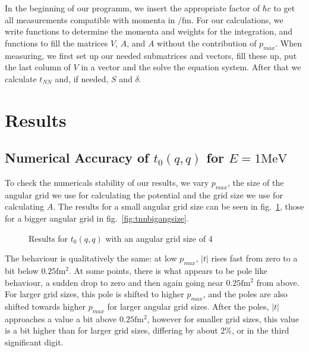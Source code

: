 \documentclass{scrartcl}
\begin{document}
In the beginning of our programm, we insert the appropriate factor of $\hbar c$ to get all measurements compatible with momenta in $\si{\per\femto\meter}$.
For our calculations, we write functions to determine the momenta and weights for the integration, and functions to fill the matrices $V$, $A$, and $A$ without the contribution of $p_{max}$. When measuring, we first set up our needed submatrices and vectors, fill these up, put the last column of $V$ in a vector and the solve the equation system. After that we calculate $t_{NN}$ and, if needed, $S$ and $\delta$.


\section{Results}
\subsection{Numerical Accuracy of $t_0(q,q)$ for $E=1\si{\mega\electronvolt}$}

To check the numericals stability of our results, we vary $p_{max}$, the size of the angular grid we use for calculating the potential and the grid size we use for calculating $A$. The results for a small angular grid size can be seen in fig.~\ref{fig:tnnsmallangsize}, those for a bigger angular grid in fig.~\ref{fig:tnnbigangsize}.


\begin{figure}[htbp]
	
	\caption{Results for $t_0(q,q)$ with an angular grid size of $4$}
	\label{fig:tnnsmallangsize}
\end{figure}


The behaviour is qualitatively the same: at low $p_{max}$, $|t|$ rises fast from zero to a bit below $0.25\si{\femto\meter^2}$. At some points, there is what appears to be pole like behaviour, a sudden drop to zero and then again going near $0.25\si{\femto\meter^2}$ from above. For larger grid sizes, this pole is shifted to higher $p_{max}$, and the poles are also shifted towards higher $p_{max}$ for larger angular grid sizes. After the poles, $|t|$ approaches a value a bit above $0.25\si{\femto\meter^2}$, however for smaller grid sizes, this value is a  bit higher than for larger grid sizes, differing by about $2\%$, or in the third significant digit.
\end{document}
